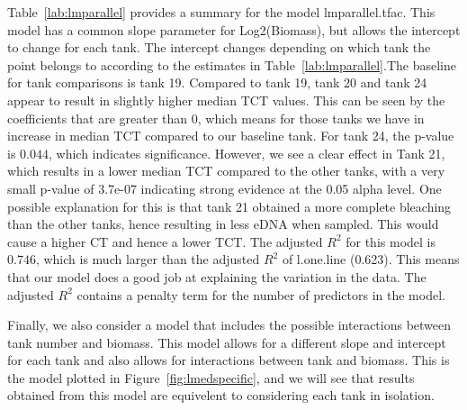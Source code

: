 Table~\ref{lab:lmparallel} provides a summary for the model  lmparallel.tfac. This model has a common slope parameter for Log2(Biomass), but allows the intercept to change for each tank.  The intercept changes depending on which tank the point belongs to according to the estimates in Table~\ref{lab:lmparallel}.The baseline for tank comparisons is tank 19. Compared to tank 19, tank 20 and tank 24 appear to result in slightly higher median TCT values. This can be seen by the coefficients that are greater than 0, which means for those tanks we have in increase in median TCT compared to our baseline tank. For tank 24, the p-value is $0.044$, which indicates significance. However, we see a clear effect in Tank 21, which results in a lower median TCT compared to the other tanks, with a very small p-value of 3.7e-07 indicating strong evidence at the 0.05 alpha level. One possible explanation for this is that tank 21 obtained a more complete bleaching than the other tanks, hence resulting in less eDNA when sampled. This would cause a higher CT and hence a lower TCT.  The adjusted $R^{2}$ for this model is $0.746$, which is much larger than the adjusted $R^{2}$ of l.one.line (0.623). This means that our model does a good job at explaining the variation in the data. The adjusted $R^{2}$ contains a penalty term for the number of predictors in the model. 





\newpage

Finally, we also consider a model that includes the possible interactions between tank number and biomass.  This model allows for a different slope and intercept for each tank and also allows for interactions between tank and biomass. This is the model plotted in Figure~\ref{fig:lmedspecific}, and we will see that results obtained from this model are equivelent to considering each tank in isolation.


